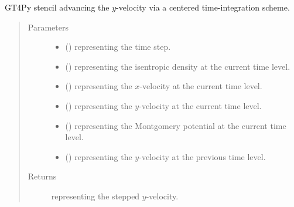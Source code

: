 \documentclass[letterpaper,10pt,english]{sphinxmanual}
\begin{document}
\begin{fulllineitems}
\begin{fulllineitems}
\label{\detokenize{api:dycore.prognostic_isentropic_nonconservative_centered.PrognosticIsentropicNonconservativeCentered._stencil_stepping_by_neglecting_vertical_advection_velocity_y_defs}}
GT4Py stencil advancing the \(y\)-velocity via a centered time-integration scheme.
\begin{quote}\begin{description}
\item[{Parameters}] \leavevmode\begin{itemize}
\item {} 
 () \textendash{}  representing the time step.

\item {} 
 () \textendash{}  representing the isentropic density at the current time level.

\item {} 
 () \textendash{}  representing the \(x\)-velocity at the current time level.

\item {} 
 () \textendash{}  representing the \(y\)-velocity at the current time level.

\item {} 
 () \textendash{}  representing the Montgomery potential at the current time level.

\item {} 
 () \textendash{}  representing the \(y\)-velocity at the previous time level.

\end{itemize}

\item[{Returns}] \leavevmode
{} representing the stepped \(y\)-velocity.


\end{description}
\end{quote}
\end{fulllineitems}
\end{fulllineitems}
\end{document}
